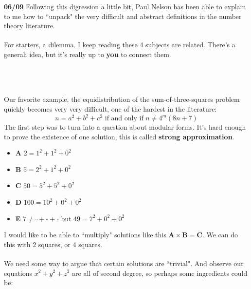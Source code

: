 \documentclass[12pt]{article}
\begin{document}
\newpage

\noindent \textbf{06/09} Following this digression a little bit, Paul Nelson has been able to explain to me how to ``unpack" the very difficult and abstract definitions in the number theory literature. \\ \\
For starters, a dilemma. I keep reading these 4 subjects are related.  There's a generali idea, but it's really up to \textbf{you} to connect them.  \\ \\
 \\ \\ 
Our favorite example, the equidistribution of the sum-of-three-squares problem quickly becomes very very difficult, one of the hardest in the literature:
$$ n = a^2 + b^2 + c^2 \text{ if and only if } n \neq 4^m (8n+7) $$
The first step was to turn into a question about modular forms.  It's hard enough to prove the existence of one solution, this is called \textbf{strong approximation}.  
\begin{itemize}
\item \textbf{A} $2 = 1^2 + 1^2 + 0^2$
\item \textbf{B} $5 = 2^2 + 1^2 + 0^2$
\item \textbf{C} $50 = 5^2 + 5^2 + 0^2$
\item \textbf{D} $100 = 10^2 + 0^2 + 0^2$
\item \textbf{E} $7 \neq \square + \square + \square $ but $49 = 7^2 + 0^2 + 0^2$
\end{itemize}
I would like to be able to ``multiply" solutions like this $\textbf{A} \times \textbf{B} = \textbf{C}$.  We can do this with 2 squares, or 4 squares. \\ \\
We need some way to argue that certain solutions are ``trivial".  And observe our equations $x^2 + y^2 + z^2$ are all of second degree, so perhaps some ingredients could be:
\end{document}
